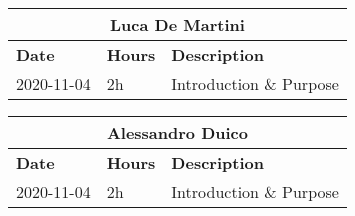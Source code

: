 
\begin{table}[H]
    \centering
    \begin{tabular}{|l|l|l|}
        \multicolumn{3}{c}{\textbf{Luca De Martini}}                   \\
        \hline
        \textbf{Date} & \textbf{Hours} & \textbf{Description}          \\\hline
        2020-11-04    & 2h             & Introduction \& Purpose       \\\hline
    \end{tabular}
\end{table}
\begin{table}[H]
    \centering
    \begin{tabular}{|l|l|l|}
        \multicolumn{3}{c}{\textbf{Alessandro Duico}}                      \\
        \hline
        \textbf{Date} & \textbf{Hours} & \textbf{Description}              \\\hline
        2020-11-04    & 2h             & Introduction \& Purpose           \\\hline
    \end{tabular}
\end{table}
